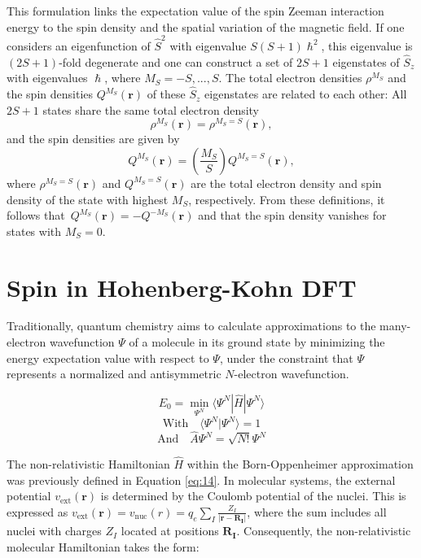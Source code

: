 \documentclass[%
 preprint, linenumbers,
 amsmath,amssymb,
 aps, physrev,
]{revtex4-2}
\begin{document}
This formulation links the expectation value of the spin Zeeman interaction energy to the spin density and the spatial variation of the magnetic field. If one considers an eigenfunction of $\hat{S}^2$ with eigenvalue $S(S+1)\hslash^2$, this eigenvalue is $(2S+1)$-fold degenerate and one can construct a set of $2S+1$ eigenstates of $\hat{S}_z$ with eigenvalues $\hslash$, where $M_S = -S,...,S$. The total electron densities $\rho^{M_S}$ and the spin densities $Q^{M_S}(\mathbf{r})$ of these $\hat{S}_z$ eigenstates are related to each other: All $2S+1$ states share the same total electron density
\begin{equation}
    \rho^{M_S}(\mathbf{r}) = \rho^{M_S=S}(\mathbf{r}),
\end{equation}
and the spin densities are given by
\begin{equation}
    Q^{M_S}(\mathbf{r}) = \left( \frac{M_S}{S} \right)Q^{M_S=S}(\mathbf{r}),
\end{equation}
where $\rho^{M_S=S}(\mathbf{r})$ and $Q^{M_S=S}(\mathbf{r})$ are the total electron density and spin density of the state with highest $M_S$, respectively. From these definitions, it follows that~$Q^{M_S}(\mathbf{r}) = -Q^{-M_S}(\mathbf{r})$ and that the spin density vanishes for states with $M_S=0$.

\section{Spin in Hohenberg-Kohn DFT}


Traditionally, quantum chemistry aims to calculate approximations to the many-electron wavefunction \( \Psi \) of a molecule in its ground state by minimizing the energy expectation value with respect to \( \Psi \), under the constraint that \( \Psi \) represents a normalized and antisymmetric \( N \)-electron wavefunction.


\begin{equation}
     E_0 = \min_{\Psi^N} \langle \Psi^N | \hat{H} | \Psi^N \rangle  
\end{equation} 
 \[ \text{With} \quad \langle \Psi^N | \Psi^N \rangle = 1  \]
 \[\text{And} \quad \hat{A} \Psi^N = \sqrt{N!} \Psi^N \]




The non-relativistic Hamiltonian \( \hat{H} \) within the Born-Oppenheimer approximation was previously defined in Equation \ref{eq:14}. In molecular systems, the external potential \( v_{\text{ext}}(\mathbf{r}) \) is determined by the Coulomb potential of the nuclei. This is expressed as \( v_{\text{ext}}(\mathbf{r}) = v_{\text{nuc}}(r) = q_e \sum_I \frac{Z_I}{|\mathbf{r} - \mathbf{R_I}|} \), where the sum includes all nuclei with charges \( Z_I \) located at positions \( \mathbf{R_I} \). Consequently, the non-relativistic molecular Hamiltonian takes the form:
\end{document}
